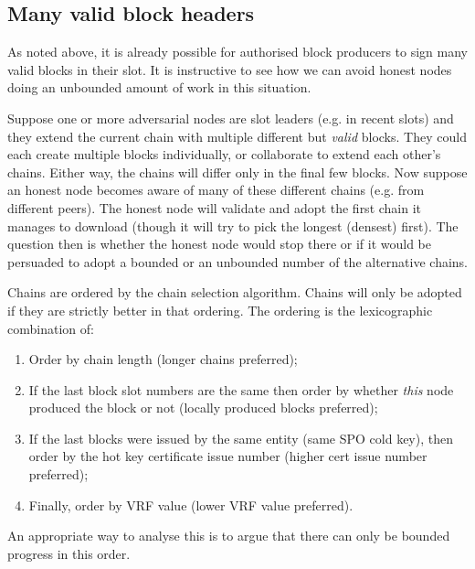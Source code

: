 \documentclass[11pt,a4paper]{article}
\begin{document}
\pagebreak

\subsection{Many valid block headers}
\label{many-valid-block-headers}
As noted above, it is already possible for authorised block producers to sign
many valid blocks in their slot. It is instructive to see how we can avoid
honest nodes doing an unbounded amount of work in this situation.

Suppose one or more adversarial nodes are slot leaders (e.g. in recent slots)
and they extend the current chain with multiple different but \emph{valid}
blocks. They could each create multiple blocks individually, or collaborate to
extend each other's chains. Either way, the chains will differ only in the final
few blocks. Now suppose an honest node becomes aware of many of these different
chains (e.g. from different peers). The honest node will validate and adopt the
first chain it manages to download (though it will try to pick the longest (densest) first).
The question then is whether the honest node would stop there or if it would be
persuaded to adopt a bounded or an unbounded number of the alternative chains.

Chains are ordered by the chain selection algorithm. Chains will only be adopted if
they are strictly better in that ordering. The ordering is the lexicographic
combination of:

\begin{enumerate}
  \item Order by chain length (longer chains preferred);
  \item If the last block slot numbers are the same then order by whether \emph{this} node produced the block or not (locally produced blocks preferred);
  \item If the last blocks were issued by the same entity (same SPO cold key), then order by the hot key certificate issue number (higher cert issue number preferred);
  \item Finally, order by VRF value (lower VRF value preferred).
\end{enumerate}

An appropriate way to analyse this is to argue that there can only be bounded
progress in this order.
\end{document}
